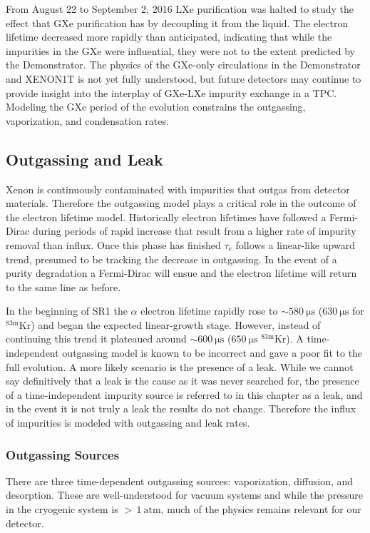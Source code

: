 From August 22 to September 2, 2016 LXe purification was halted to study the effect that GXe purification has by
decoupling it from the liquid.  The electron lifetime decreased more rapidly than anticipated, indicating that while the
impurities in the GXe were influential, they were not to the extent predicted by the Demonstrator.  The physics of the GXe-only
circulations in the Demonstrator and XENON1T is not yet fully understood, but future detectors may continue to provide insight into
the interplay of GXe-LXe impurity exchange in a TPC.  Modeling the GXe period of the evolution constrains the outgassing,
vaporization, and condensation rates.



\subsection{Outgassing and Leak}
\label{subsec:electron_lifetime_model_outgassing}
Xenon is continuously contaminated with impurities that outgas from detector materials.  Therefore the outgassing model plays a
critical role in the outcome of the electron lifetime model.  Historically electron lifetimes have followed a Fermi-Dirac during periods
of rapid increase that result from a higher rate of impurity removal than influx.  Once this phase has
finished $\tau_e$ follows a linear-like upward trend, presumed to be tracking the decrease in outgassing.  In the event of a
purity degradation a Fermi-Dirac will ensue and the electron lifetime will return to the same line as before.

In the beginning of SR1 the $\alpha$ electron lifetime rapidly rose to ${\sim} 580\ \mathrm{\mu s}$ ($630\ \mathrm{\mu s}$ for
$\mathrm{^{83m}Kr}$) and began the expected linear-growth stage.  However, instead of continuing this trend
it plateaued around ${\sim} 600\ \mathrm{\mu s}$ ($650\ \mathrm{\mu s}$ $\mathrm{^{83m}Kr}$).  A time-independent outgassing model is
known to be incorrect and
gave a poor fit to the full evolution.  A more likely scenario is the presence of a leak.  While we cannot say definitively that a leak
is the cause as it was never searched for, the presence of a time-independent impurity source is referred to in this chapter as a
leak, and in the event it is not truly a leak the results do not change.  Therefore the influx of impurities is modeled with
outgassing and leak rates.



\subsubsection{Outgassing Sources}
\label{subsubsec:electron_lifetime_model_outgassing_sources}
There are three time-dependent outgassing sources: vaporization, diffusion, and desorption.  These are well-understood for vacuum systems
and while the pressure in the cryogenic system is ${>}\, 1\ \mathrm{atm}$, much of the physics remains relevant for our detector.


